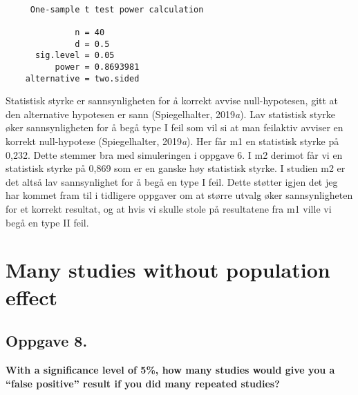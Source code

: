 \documentclass[
  letterpaper,
  DIV=11,
  numbers=noendperiod]{scrreprt}
\begin{document}
\begin{verbatim}

     One-sample t test power calculation 

              n = 40
              d = 0.5
      sig.level = 0.05
          power = 0.8693981
    alternative = two.sided
\end{verbatim}

Statistisk styrke er sannsynligheten for å korrekt avvise
null-hypotesen, gitt at den alternative hypotesen er sann
(Spiegelhalter, 2019\emph{a}). Lav statistisk styrke øker
sannsynligheten for å begå type I feil som vil si at man feilaktiv
avviser en korrekt null-hypotese (Spiegelhalter, 2019\emph{a}). Her får
m1 en statistisk styrke på 0,232. Dette stemmer bra med simuleringen i
oppgave 6. I m2 derimot får vi en statistisk styrke på 0,869 som er en
ganske høy statistisk styrke. I studien m2 er det altså lav
sannsynlighet for å begå en type I feil. Dette støtter igjen det jeg har
kommet fram til i tidligere oppgaver om at større utvalg øker
sannsynligheten for et korrekt resultat, og at hvis vi skulle stole på
resultatene fra m1 ville vi begå en type II feil.

\section{Many studies without population
effect}\label{many-studies-without-population-effect}

\subsection{Oppgave 8.}\label{oppgave-8.}

\textbf{With a significance level of 5\%, how many studies would give
you a ``false positive'' result if you did many repeated studies?}
\end{document}
